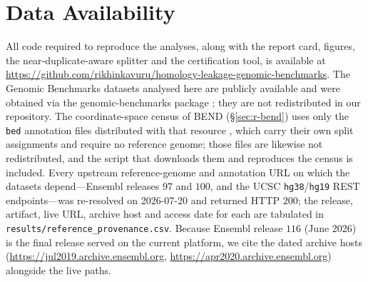 \documentclass[webpdf,modern,large,namedate]{oup-authoring-template}%
\begin{document}
\section*{Data Availability}
All code required to reproduce the analyses, along with the report card, figures, the near-duplicate-aware splitter and the certification tool, is available at \url{https://github.com/rikhinkavuru/homology-leakage-genomic-benchmarks}. The Genomic Benchmarks datasets analysed here are publicly available and were obtained via the genomic-benchmarks package \citep{gresova2023}; they are not redistributed in our repository. The coordinate-space census of BEND (\S\ref{sec:r-bend}) uses only the \texttt{bed} annotation files distributed with that resource \citep{marin2024bend}, which carry their own split assignments and require no reference genome; those files are likewise not redistributed, and the script that downloads them and reproduces the census is included. Every upstream reference-genome and annotation URL on which the datasets depend---Ensembl releases $97$ and $100$, and the UCSC \texttt{hg38}/\texttt{hg19} REST endpoints---was re-resolved on 2026-07-20 and returned HTTP $200$; the release, artifact, live URL, archive host and access date for each are tabulated in \texttt{results/reference\_provenance.csv}. Because Ensembl release $116$ (June 2026) is the final release served on the current platform, we cite the dated archive hosts (\url{https://jul2019.archive.ensembl.org}, \url{https://apr2020.archive.ensembl.org}) alongside the live paths.



\end{document}
